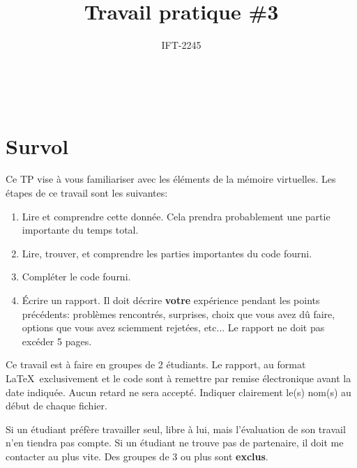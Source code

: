 \documentclass{article}
\title{Travail pratique \#3}
\author{IFT-2245}
\begin{document}
\maketitle

{\centering {} \\}

\newcommand \mML {\ensuremath\mu\textsl{ML}}
\newcommand \kw [1] {\textsf{#1}}
\newcommand \id [1] {\textsl{#1}}
\newcommand \punc [1] {\kw{`#1'}}
\newcommand \str [1] {\texttt{"#1"}}
\newenvironment{outitemize}{
  \begin{itemize}
  \let \origitem \item \def \item {\origitem[]\hspace{-18pt}}
}{
  \end{itemize}
}
\newcommand \Align [2][t] {
  \begin{array}[#1]{@{}l}
    #2
  \end{array}}

\section{Survol}

Ce TP vise à vous familiariser avec les éléments de la mémoire virtuelles.
Les étapes de ce travail sont les suivantes:
\begin{enumerate}
\item Lire et comprendre cette donnée.  Cela prendra probablement une partie
  importante du temps total.
\item Lire, trouver, et comprendre les parties importantes du code fourni.
\item Compléter le code fourni.
\item Écrire un rapport.  Il doit décrire \textbf{votre} expérience pendant
  les points précédents: problèmes rencontrés, surprises, choix que vous
  avez dû faire, options que vous avez sciemment rejetées, etc...  Le
  rapport ne doit pas excéder 5 pages.
\end{enumerate}

Ce travail est à faire en groupes de 2 étudiants.  Le rapport, au format
\LaTeX\ exclusivement et le code sont
à remettre par remise électronique avant la date indiquée.  Aucun retard ne
sera accepté.  Indiquer clairement le(s) nom(s) au début de chaque fichier.

Si un étudiant préfère travailler seul, libre à lui, mais l'évaluation de
son travail n'en tiendra pas compte.  Si un étudiant ne trouve pas de
partenaire, il doit me contacter au plus vite.  Des groupes de 3 ou plus
sont \textbf{exclus}.
\end{document}
